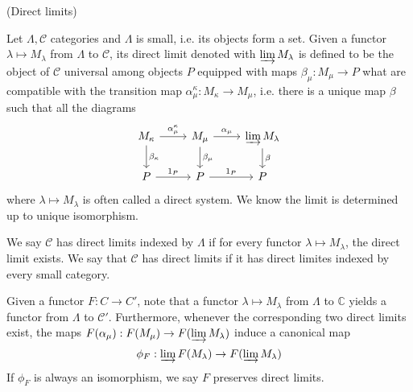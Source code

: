 \documentclass{article}
\begin{document}
    \begin{definition}
        (Direct limits)\par
        Let $\Lambda,\mathcal{C}$ categories and $\Lambda$ is small, i.e. its objects form a set. Given a functor $\lambda \mapsto M_{\lambda}$ from $\Lambda$ to $\mathcal{C}$, its direct limit denoted with $\varinjlim M_{\lambda}$ is defined to be the object of $\mathcal{C}$ universal among objects $P$ equipped with maps $\beta_{\mu}:M_{\mu} \to P$ what are compatible with the transition map $\alpha_{\mu}^{\kappa}:M_{\kappa} \to M_{\mu}$, i.e. there is a unique map $\beta$ such that all the diagrams
        \[
        \begin{tikzcd}
            M_{\kappa}\arrow[r,"\alpha_{\mu}^{\kappa}"]\arrow[d,"\beta_{\kappa}"] & M_{\mu}\arrow[r,
            "\alpha_{\mu}"]\arrow[d,"\beta_{\mu}"] & \varinjlim M_{\lambda}\arrow[d,"\beta"] \\
            P\arrow[r,"1_P"] & P\arrow[r,"1_P"] & P
        \end{tikzcd}
        \]
        where $\lambda\mapsto M_{\lambda}$ is often called a direct system. We know the limit is determined up to unique isomorphism.\par
        We say $\mathcal{C}$ has direct limits indexed by $\Lambda$ if for every functor $\lambda \mapsto M_{\lambda}$, the direct limit exists. We say that $\mathcal{C}$ has direct limits if it has direct limites indexed by every small category.\par
        Given a functor $F:C\to C'$, note that a functor  $\lambda\mapsto M_{\lambda}$ from $\Lambda$ to $\mathbb{C}$ yields a functor from $\Lambda$ to $\mathcal{C}'$. Furthermore, whenever the corresponding two direct limits exist, the maps $F(\alpha_{\mu}):F(M_{\mu}) \to F(\varinjlim M_{\lambda})$ induce a canonical map
        \[\phi_F:\varinjlim F(M_{\lambda}) \to F(\varinjlim M_{\lambda})\]
        If $\phi_F$ is always an isomorphism, we say $F$ preserves direct limits.
    \end{definition}
\end{document}
